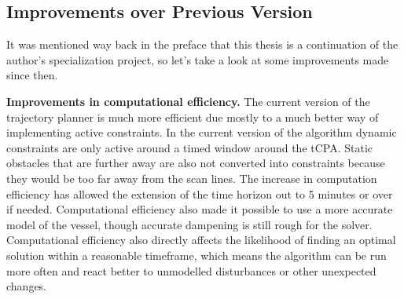 \subsection{Improvements over Previous Version}
It was mentioned way back in the preface that this thesis is a continuation of the author's specialization project, so let's take a look at some improvements made since then.

\textbf{Improvements in computational efficiency.} \newline
The current version of the trajectory planner is much more efficient due mostly to a much better way of implementing active constraints.
In the current version of the algorithm dynamic constraints are only active around a timed window around the tCPA. Static obstacles that
are further away are also not converted into constraints because they would be too far away from the scan lines. The increase in
computation efficiency has allowed the extension of the time horizon out to 5 minutes or over if needed. Computational efficiency also 
made it possible to use a more accurate model of the vessel, though accurate dampening is still rough for the solver. Computational 
efficiency also directly affects the likelihood of finding an optimal solution within a reasonable timeframe, which means the algorithm can be run
more often and react better to unmodelled disturbances or other unexpected changes.

